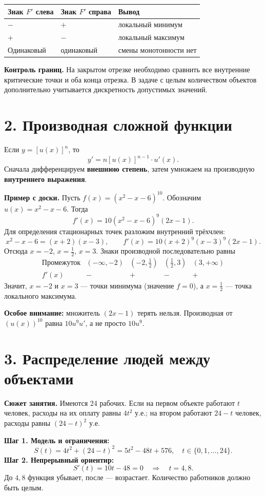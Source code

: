 \documentclass[a4paper,11pt]{article}
\newcommand{\topic}[1]{\Needspace{5\baselineskip}\section*{\color{darkaccent}#1}\vspace{-2mm}}
\newcommand{\key}[1]{\textcolor{darkaccent}{\textbf{#1}}}
\begin{document}
\begin{center}
\begin{tabular}{@{}lll@{}}
\toprule
Знак $F'$ слева & Знак $F'$ справа & Вывод\\
\midrule
$-$ & $+$ & локальный минимум\\
$+$ & $-$ & локальный максимум\\
Одинаковый & одинаковый & смены монотонности нет\\
\bottomrule
\end{tabular}
\end{center}

\key{Контроль границ.} На закрытом отрезке необходимо сравнить все внутренние критические точки и оба конца отрезка. В задаче с целым количеством объектов дополнительно учитывается дискретность допустимых значений.

\topic{2. Производная сложной функции}
Если $y=[u(x)]^n$, то
\[
\boxed{y'=n[u(x)]^{n-1}\cdot u'(x).}
\]
Сначала дифференцируем \textbf{внешнюю степень}, затем умножаем на производную \textbf{внутреннего выражения}.

\key{Пример с доски.} Пусть $f(x)=(x^2-x-6)^{10}$. Обозначим $u(x)=x^2-x-6$. Тогда
\[
f'(x)=10(x^2-x-6)^9(2x-1).
\]
\clearpage
Для определения стационарных точек разложим внутренний трёхчлен:
\[
x^2-x-6=(x+2)(x-3),\qquad
f'(x)=10(x+2)^9(x-3)^9(2x-1).
\]
Отсюда $x=-2$, $x=\tfrac12$, $x=3$. Знаки производной последовательно равны
\[
\begin{array}{c|cccc}
\text{Промежуток} & (-\infty,-2)&(-2,\tfrac12)&(\tfrac12,3)&(3,+\infty)\\\hline
f'(x)&-&+&-&+
\end{array}
\]
Значит, $x=-2$ и $x=3$ — точки минимума (значение $f=0$), а $x=\tfrac12$ — точка локального максимума.

\key{Особое внимание:} множитель $(2x-1)$ терять нельзя. Производная от $(u(x))^{10}$ равна $10u^9u'$, а не просто $10u^9$.

\topic{3. Распределение людей между объектами}
\key{Сюжет занятия.} Имеются 24 рабочих. Если на первом объекте работают $t$ человек, расходы на их оплату равны $4t^2$ у.е.; на втором работают $24-t$ человек, расходы равны $(24-t)^2$ у.е.

\textbf{Шаг 1. Модель и ограничения:}
\[
S(t)=4t^2+(24-t)^2=5t^2-48t+576,
\quad t\in\{0,1,\ldots,24\}.
\]
\textbf{Шаг 2. Непрерывный ориентир:}
\[
S'(t)=10t-48=0\quad\Longrightarrow\quad t=4{,}8.
\]
До $4{,}8$ функция убывает, после — возрастает. Количество работников должно быть целым.
\end{document}
